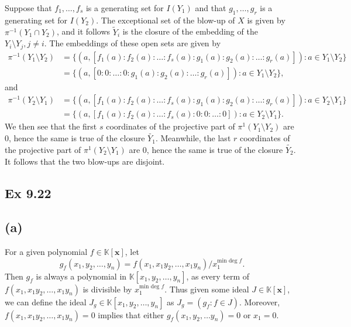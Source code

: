 \documentclass{article}
\theoremstyle{definition}
\newcommand{\K}{\mathbb{K}}
\newcommand{\Kx}{\K[\bm{x}]}
\begin{document}
Suppose that $f_1, \ldots, f_s$ is a generating set for $I(Y_1)$ and that $g_1,
\ldots, g_r$ is a generating set for $I(Y_2)$. The exceptional set of the
blow-up of $X$ is given by $\pi^{-1}(Y_1 \cap Y_2)$, and it follows
$\widetilde{Y}_i$ is the closure of the embedding of the $Y_i \setminus Y_j, j
\not = i$. The embeddings of these open sets are given by 
\begin{align*}
	\pi^{-1}(Y_1 \setminus Y_2)
	&=
	\{ 
		(a, [f_1(a):f_2(a):\ldots:f_s(a):g_1(a):g_2(a):\ldots:g_r(a)])
		:
		a \in Y_1 \setminus Y_2
	\} \\
	&=
	\{ 
		(a, [0:0:\ldots:0:g_1(a):g_2(a):\ldots:g_r(a)])
		:
		a \in Y_1 \setminus Y_2
	\}, 
\end{align*}
and 
\begin{align*}
	\pi^{-1}(Y_2 \setminus Y_1)
	&=
	\{ 
		(a, [f_1(a):f_2(a):\ldots:f_s(a):g_1(a):g_2(a):\ldots:g_r(a)])
		:
		a \in Y_2 \setminus Y_1
	\} \\
	&=
	\{ 
		(a, [f_1(a):f_2(a):\ldots:f_s(a):0:0:\ldots:0])
		:
		a \in Y_2 \setminus Y_1
	\}.
\end{align*}
We then see that the first $s$ coordinates of the projective part of
$\pi^{1}(Y_1 \setminus Y_2)$ are $0$, hence the same is true of the closure
$\widetilde{Y_1}$. Meanwhile, the last $r$ coordinates of the projective part
of $\pi^{1}(Y_2 \setminus Y_1)$ are $0$, hence the same is true of the closure
$\widetilde{Y_2}$. It follows that the two blow-ups are disjoint.


\subsection*{Ex 9.22}

\subsection*{(a)}

For a given polynomial $f \in \Kx$, let 
\[
	g_f(x_1, y_2, \ldots, y_n) 
	=
	f(x_1, x_1y_2, \ldots, x_1y_n)/x_1^{\text{min deg } f}.
\]
Then $g_f$ is always a polynomial in $\K[x_1, y_2, \ldots, y_n]$, as every term
of $f(x_1, x_1y_2, \ldots, x_1y_n)$ is divisible by $x_1^{\text{min deg } f}$.
Thus given some ideal $J \in \Kx$, we can define the ideal $J_g \in \K[x_1, y_2, \ldots, y_n]$
as $J_g = (g_f : f \in J)$. Moreover, $f(x_1, x_1y_2, \ldots, x_1 y_n) = 0$
implies that either $g_f(x_1, y_2, \ldots y_n) = 0$ or $x_1 = 0$. \\
\end{document}
